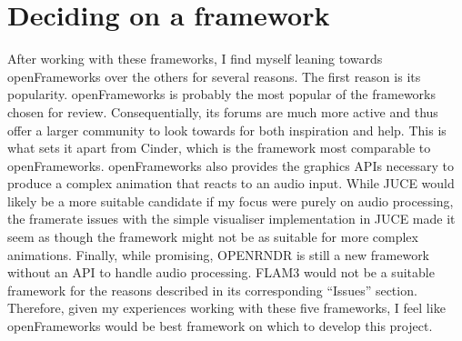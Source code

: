 \documentclass{article}
\begin{document}
\section{Deciding on a framework}
After working with these frameworks, I find myself leaning towards openFrameworks over the others for several reasons. The first reason is its popularity. openFrameworks is probably the most popular of the frameworks chosen for review. Consequentially, its forums are much more active and thus offer a larger community to look towards for both inspiration and help. This is what sets it apart from Cinder, which is the framework most comparable to openFrameworks. openFrameworks also provides the graphics APIs necessary to produce a complex animation that reacts to an audio input. While JUCE would likely be a more suitable candidate if my focus were purely on audio processing, the framerate issues with the simple visualiser implementation in JUCE made it seem as though the framework might not be as suitable for more complex animations. Finally, while promising, OPENRNDR is still a new framework without an API to handle audio processing. FLAM3 would not be a suitable framework for the reasons described in its corresponding ``Issues'' section. Therefore, given my experiences working with these five frameworks, I feel like openFrameworks would be best framework on which to develop this project.

\printbibliography
\end{document}
